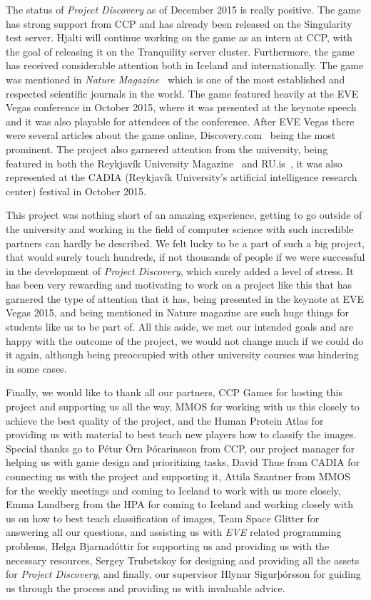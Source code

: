 The status of \emph{Project Discovery} as of December 2015 is really positive. The game has strong support from CCP and has already been released on the Singularity test server. Hjalti will continue working on the game as an intern at CCP, with the goal of releasing it on the Tranquility server cluster. Furthermore, the game has received considerable attention both in Iceland and internationally. The game was mentioned in \emph{Nature Magazine}~\cite{nature} which is one of the most established and respected scientific journals in the world. The game featured heavily at the EVE Vegas conference in October 2015, where it was presented at the keynote speech and it was also playable for attendees of the conference. After EVE Vegas there were several articles about the game online, Discovery.com~\cite{discovery} being the most prominent. The project also garnered attention from the university, being featured in both the Reykjavík University Magazine~\cite{rumag} and RU.is~\cite{ruis}, it was also represented at the CADIA (Reykjavík University's artificial intelligence research center) festival in October 2015. 

This project was nothing short of an amazing experience, getting to go outside of the university and working in the field of computer science with such incredible partners can hardly be described. We felt lucky to be a part of such a big project, that would surely touch hundreds, if not thousands of people if we were successful in the development of \emph{Project Discovery}, which surely added a level of stress. It has been very rewarding and motivating to work on a project like this that has garnered the type of attention that it has, being presented in the keynote at EVE Vegas 2015, and being mentioned in Nature magazine are such huge things for students like us to be part of. All this aside, we met our intended goals and are happy with the outcome of the project, we would not change much if we could do it again, although being preoccupied with other university courses was hindering in some cases.

Finally, we would like to thank all our partners, CCP Games for hosting this project and supporting us all the way, MMOS for working with us this closely to achieve the best quality of the project, and the Human Protein Atlas for providing us with material to best teach new players how to classify the images. Special thanks go to Pétur Örn Þórarinsson from CCP, our project manager for helping us with game design and prioritizing tasks, David Thue from CADIA for connecting us with the project and supporting it, Attila Szantner from MMOS for the weekly meetings and coming to Iceland to work with us more closely, Emma Lundberg from the HPA for coming to Iceland and working closely with us on how to best teach classification of images, Team Space Glitter for answering all our questions, and assisting us with \emph{EVE} related programming problems, Helga Bjarnadóttir for supporting us and providing us with the necessary resources, Sergey Trubetskoy for designing and providing all the assets for \emph{Project Discovery}, and finally, our supervisor Hlynur Sigurþórsson for guiding us through the process and providing us with invaluable advice. 

